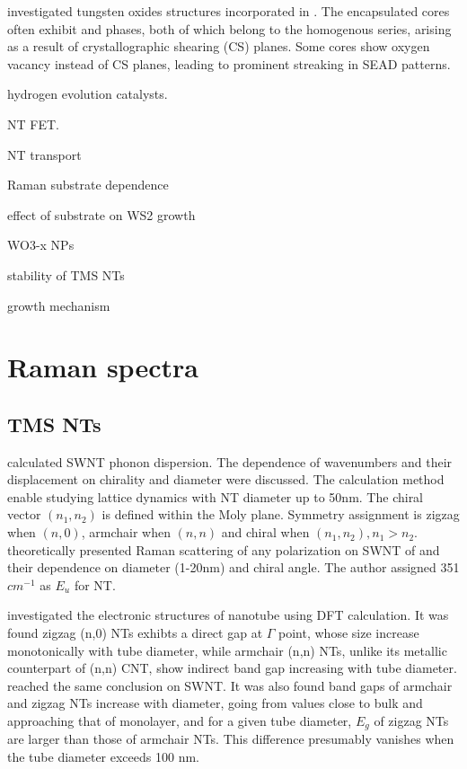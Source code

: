 \citeauthor{Sloan1999} investigated tungsten oxides structures incorporated in .\cite{Sloan1999} The encapsulated  cores often exhibit  and  phases, both of which belong to the  homogenous series, arising as a result of crystallographic shearing (CS) planes.\cite{Miyano} Some  cores show oxygen vacancy instead of CS planes, leading to prominent streaking in SEAD patterns.


hydrogen evolution catalysts. \cite{Merki2011}

 NT FET. \cite{Levi2013}

 NT transport \cite{Zhang2012c}

Raman substrate dependence \cite{Buscema2013}

effect of substrate on WS2 growth\cite{Genut1992}

WO3-x NPs \cite{Frey2001}

stability of TMS NTs \cite{Seifert2002}

growth mechanism \cite{ZAK2009}

\section{Raman spectra}

\subsection{TMS NTs}

\citeauthor{Dobardzic2005} calculated  SWNT phonon dispersion. The dependence of wavenumbers and their displacement on chirality and diameter were discussed. The calculation method enable studying lattice dynamics with NT diameter up to 50nm. The chiral vector $(n_1, n_2)$ is defined within the Moly plane. Symmetry assignment is zigzag when $(n,0)$, armchair when $(n,n)$ and chiral when $(n_1, n_2), n_1>n_2$. \citeauthor{Dobardzic2006} theoretically presented Raman scattering of any polarization on SWNT of  and their dependence on diameter (1-20nm) and chiral angle. The author assigned 351 $cm^{-1}$ as $E_u$ for  NT.\cite{Dobardzic2006}

\citeauthor{Seifert2000} investigated the electronic structures of  nanotube using DFT calculation.\cite{Seifert2000} It was found zigzag (n,0) NTs exhibts a direct gap at $\Gamma$ point, whose size increase monotonically with tube diameter, while armchair (n,n) NTs, unlike its metallic counterpart of (n,n) CNT, show indirect band gap increasing with tube diameter. \citeauthor{Zibouche2012} reached the same conclusion on  SWNT.\cite{Zibouche2012} It was also found band gaps of armchair and zigzag NTs increase with diameter, going from values close to bulk and approaching that of  monolayer, and for a given tube diameter, $E_g$ of zigzag NTs are larger than those of armchair NTs. This difference presumably vanishes when the tube diameter exceeds 100 nm.

